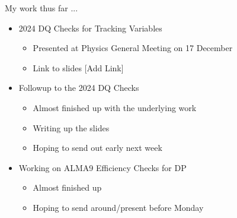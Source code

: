 
\begin{frame}{My work thus far ...}
    \begin{itemize}
        \item 2024 DQ Checks for Tracking Variables
        \begin{itemize}
            \item Presented at Physics General Meeting on 17 December 
            \item Link to slides [Add Link]
        \end{itemize}
        \item Followup to the 2024 DQ Checks
        \begin{itemize}
            \item Almost finished up with the underlying work 
            \item Writing up the slides
            \item Hoping to send out early next week
        \end{itemize}
        \item Working on ALMA9 Efficiency Checks for DP
        \begin{itemize}
            \item Almost finished up 
            \item Hoping to send around/present before Monday
        \end{itemize}
    \end{itemize}
\end{frame}


